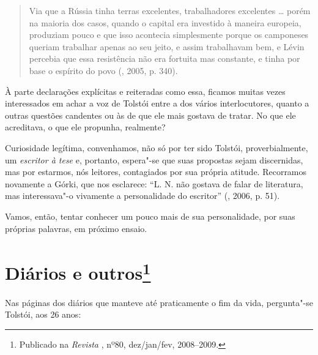 \begin{quotation}
Via que a Rússia tinha terras excelentes, trabalhadores excelentes \ldots{}
porém na maioria dos casos, quando o capital era investido à maneira
europeia, produziam pouco e que isso
acontecia simplesmente porque os camponeses queriam trabalhar apenas ao
seu jeito, e assim trabalhavam bem, e Lévin percebia que essa
resistência não era fortuita mas constante, e tinha por base o espírito
do povo (, 2005, p. 340).
\end{quotation}

À parte declarações explícitas e reiteradas como essa, ficamos muitas
vezes interessados em achar a voz de Tolstói entre a dos
vários interlocutores, quanto a outras questões candentes ou às de que
ele mais gostava de tratar. No que ele acreditava, o que ele propunha,
realmente?

Curiosidade legítima, convenhamos, não só por ter sido Tolstói,
proverbialmente, um \emph{escritor à tese} e, portanto, espera"-se que suas
propostas sejam discernidas, mas por estarmos, nós leitores,
contagiados por sua própria atitude. Recorramos novamente a
Górki, que nos esclarece: ``L. N. não gostava
de falar de literatura, mas interessava"-o vivamente a personalidade do
escritor'' (, 2006, p. 51).

Vamos, então, tentar conhecer um pouco mais de sua personalidade, por
suas próprias palavras, em próximo ensaio.

\chapter{Diários e outros\footnote{Publicado na \emph{Revista \protect{}}, nº80, dez/jan/fev, 2008--2009.}}
\label{diarios}

Nas páginas dos diários que manteve até praticamente o fim da vida,
pergunta"-se Tolstói, aos 26 anos:

